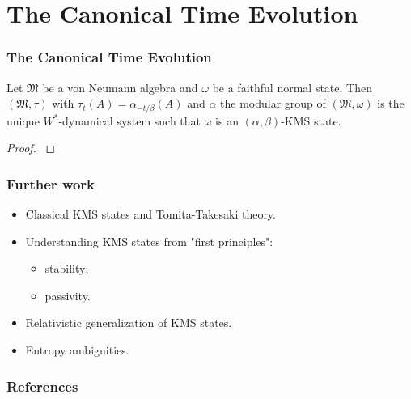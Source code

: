 \documentclass{beamer}
\begin{document}
\section{The Canonical Time Evolution}

\begin{frame}
	\frametitle{The Canonical Time Evolution}
	\begin{theorem}[$\bigstar\bigstar\bigstar$]
		Let $\mathfrak{M}$ be a von Neumann algebra and $\omega$ be a faithful normal state. Then $(\mathfrak{M},\tau)$ with $\tau_t(A) = \alpha_{-t/\beta}(A)$ and $\alpha$ the modular group of $(\mathfrak{M},\omega)$ is the unique $W^*$-dynamical system such that $\omega$ is an $(\alpha,\beta)$-KMS state.
	\end{theorem}
	\begin{proof}
		\cite{Duvenhage1999}
	\end{proof}
\end{frame}

\begin{frame}
	\frametitle{Further work}
	\begin{itemize}
		\item Classical KMS states and Tomita-Takesaki theory.
		\item Understanding KMS states from "first principles":
		\begin{itemize}
			\item stability;
			\item passivity.
		\end{itemize}
		\item Relativistic generalization of KMS states.
		\item Entropy ambiguities. 
	\end{itemize}
\end{frame}

\begin{frame}[allowframebreaks]
	\frametitle{References}
	
	
\end{frame}
\end{document}
